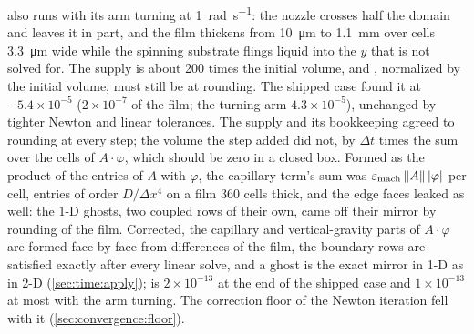  also runs  with its arm
turning at \SI{1}{\radian\per\second}: the nozzle crosses half the domain
and leaves it in part, and the film thickens from \SI{10}{\micro\metre} to
\SI{1.1}{\milli\metre} over cells \SI{3.3}{\micro\metre} wide while the
spinning substrate flings liquid into the $y$ that is not solved for. The
supply is about 200 times the initial volume, and , normalized
by the initial volume, must still be at rounding. The shipped case found it
at $-5.4\times10^{-5}$ ($2\times10^{-7}$ of the film; the turning arm
$4.3\times10^{-5}$), unchanged by tighter Newton and linear tolerances. The
supply and its bookkeeping agreed to rounding at every step; the volume the
step added did not, by $\Delta t$ times the sum over the cells of
$A\cdot\varphi$, which should be zero in a closed box. Formed as the product
of the entries of $A$ with $\varphi$, the capillary term's sum was
$\varepsilon_{\mathrm{mach}}\,\lVert A\rVert\,\lvert\varphi\rvert$ per cell, entries of order
$D/\Delta x^{4}$ on a film 360 cells thick, and the edge faces leaked as
well: the 1-D  ghosts, two coupled rows of their own, came
off their mirror by rounding of the film. Corrected, the capillary and
vertical-gravity parts of $A\cdot\varphi$ are formed face by face from
differences of the film, the boundary rows are satisfied exactly after every
linear solve, and a  ghost is the exact mirror in 1-D as in
2-D (\cref{sec:time:apply});  is $2\times10^{-13}$ at the end
of the shipped case and $1\times10^{-13}$ at most with the arm turning. The
correction floor of the Newton iteration fell with it
(\cref{sec:convergence:floor}).

